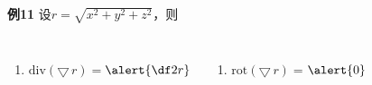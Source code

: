 \begin{frame}
	\linespread{1.8}
	\begin{exampleblock}{{\bf 例11}\hfill}
		设$r=\sqrt{x^2+y^2+z^2}$，则\pause
		\begin{columns}
				\begin{enumerate}
				  \item $\mathrm{div}(\bigtriangledown\,r)=$\pause$\alert{\df 2r}$\pause
				\end{enumerate}
				\begin{enumerate}
				  \addtocounter{enumi}{1}
				  \item $\mathrm{rot}(\bigtriangledown\,r)=$\pause$\alert{0}$
				\end{enumerate}
		\end{columns}
	\end{exampleblock}
\end{frame}


% 
